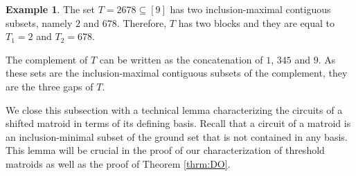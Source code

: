 \documentclass{amsart}
\theoremstyle{definition}
\newtheorem{example}[defn]{Example}
\theoremstyle{plain}
\begin{document}
\begin{example}
The set $T= 2678\subseteq [9]$ has two inclusion-maximal contiguous subsets, namely $2$ and $678$. Therefore, $T$ has two blocks and they are equal to $T_1=2$ and $T_2=678$.

The complement of $T$ can be written as the concatenation of $1$, $345$ and $9$. As these sets are the inclusion-maximal contiguous subsets of the complement, they are the three gaps of $T$.
\end{example}


We close this subsection with a technical lemma characterizing the circuits of a shifted matroid in terms of its defining basis. Recall that a circuit of a matroid is an inclusion-minimal subset of the ground set that is not contained in any basis. This lemma will be crucial in the proof of our characterization of threshold matroids as well as the proof of Theorem \ref{thrm:DO}.
\end{document}
